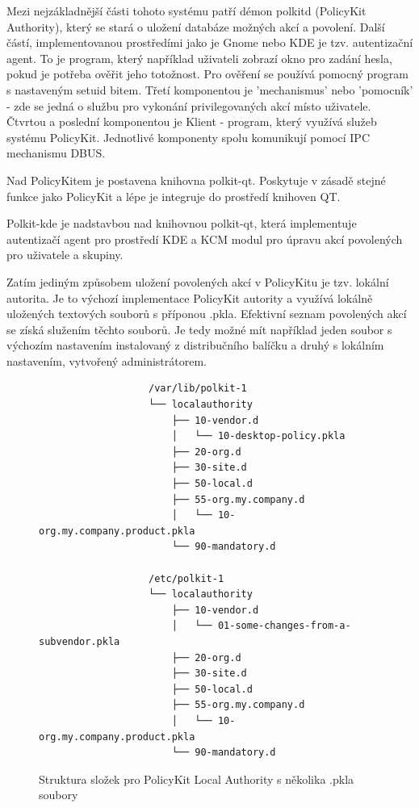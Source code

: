 Mezi nejzákladnější části tohoto systému patří démon polkitd (PolicyKit
Authority), který se stará o uložení databáze možných akcí a povolení. Další
částí, implementovanou prostředími jako je Gnome nebo KDE je tzv. autentizační
agent. To je program, který například uživateli zobrazí okno pro zadání hesla,
pokud je potřeba ověřit jeho totožnost. Pro ověření se používá pomocný program
s nastaveným setuid bitem.%
Třetí komponentou je 'mechanismus' nebo 'pomocník' - zde se jedná o službu pro
vykonání privilegovaných akcí místo uživatele. Čtvrtou a poslední komponentou
je Klient - program, který využívá služeb systému PolicyKit. Jednotlivé
komponenty spolu komunikují pomocí IPC mechanismu DBUS.%

Nad PolicyKitem je postavena knihovna polkit-qt. Poskytuje v zásadě stejné
funkce jako PolicyKit a lépe je integruje do prostředí knihoven QT. %

Polkit-kde je nadstavbou nad knihovnou polkit-qt, která implementuje autentizačí
agent pro prostředí KDE a KCM modul pro úpravu akcí povolených pro uživatele
a skupiny.

Zatím jediným způsobem uložení povolených akcí v PolicyKitu je tzv. lokální
autorita. Je to výchozí implementace PolicyKit autority a využívá lokálně
uložených textových souborů s příponou .pkla. Efektivní seznam povolených akcí
se získá služením těchto souborů. Je tedy možné mít například jeden soubor
s výchozím nastavením instalovaný z distribučního balíčku a druhý s lokálním
nastavením, vytvořený administrátorem.

\begin{figure}[h]
    \centering
    \begin{verbatim}
                   /var/lib/polkit-1
                   └── localauthority
                       ├── 10-vendor.d
                       │   └── 10-desktop-policy.pkla
                       ├── 20-org.d
                       ├── 30-site.d
                       ├── 50-local.d
                       ├── 55-org.my.company.d
                       │   └── 10-org.my.company.product.pkla
                       └── 90-mandatory.d

                   /etc/polkit-1
                   └── localauthority
                       ├── 10-vendor.d
                       │   └── 01-some-changes-from-a-subvendor.pkla
                       ├── 20-org.d
                       ├── 30-site.d
                       ├── 50-local.d
                       ├── 55-org.my.company.d
                       │   └── 10-org.my.company.product.pkla
                       └── 90-mandatory.d
    \end{verbatim}
    \caption{Struktura složek pro PolicyKit Local Authority s několika .pkla soubory}
    \label{fig:pkit_la}
\end{figure}

